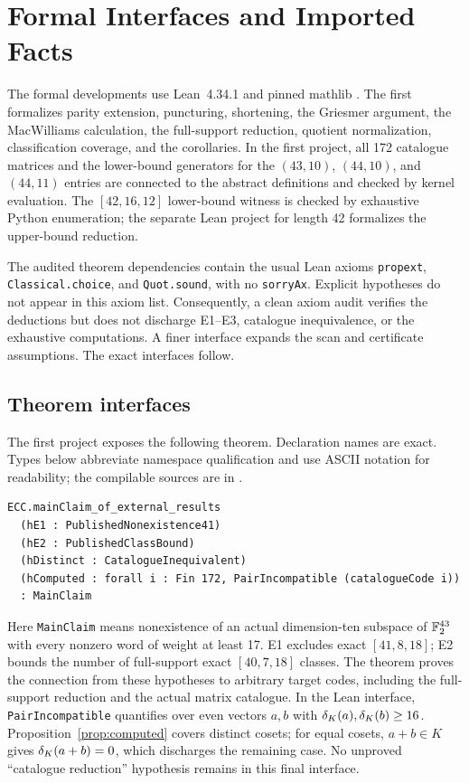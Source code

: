 \section{Formal Interfaces and Imported Facts}
\label{app:formal}
The formal developments use Lean~4.34.1 \citep{lean2021} and pinned mathlib \citep{mathlib2020}. The first formalizes parity extension, puncturing, shortening, the Griesmer argument, the MacWilliams calculation, the full-support reduction, quotient normalization, classification coverage, and the corollaries. In the first project, all 172 catalogue matrices and the lower-bound generators for the $(43,10)$, $(44,10)$, and $(44,11)$ entries are connected to the abstract definitions and checked by kernel evaluation. The $[42,16,12]$ lower-bound witness is checked by exhaustive Python enumeration; the separate Lean project for length 42 formalizes the upper-bound reduction.

The audited theorem dependencies contain the usual Lean axioms \texttt{propext}, \texttt{Classical.choice}, and \texttt{Quot.sound}, with no \texttt{sorryAx}. Explicit hypotheses do not appear in this axiom list. Consequently, a clean axiom audit verifies the deductions but does not discharge E1--E3, catalogue inequivalence, or the exhaustive computations. A finer interface expands the scan and certificate assumptions. The exact interfaces follow.

\subsection{Theorem interfaces}
The first project exposes the following theorem. Declaration names are exact. Types below abbreviate namespace qualification and use ASCII notation for readability; the compilable sources are in .
\begin{lstlisting}[basicstyle=\ttfamily\small,breaklines=true]
ECC.mainClaim_of_external_results
  (hE1 : PublishedNonexistence41)
  (hE2 : PublishedClassBound)
  (hDistinct : CatalogueInequivalent)
  (hComputed : forall i : Fin 172, PairIncompatible (catalogueCode i))
  : MainClaim
\end{lstlisting}
Here \texttt{MainClaim} means nonexistence of an actual dimension-ten subspace of $\mathbb F_2^{43}$ with every nonzero word of weight at least 17. E1 excludes exact $[41,8,18]$; E2 bounds the number of full-support exact $[40,7,18]$ classes. The theorem proves the connection from these hypotheses to arbitrary target codes, including the full-support reduction and the actual matrix catalogue. In the Lean interface, \texttt{PairIncompatible} quantifies over even vectors $a,b$ with $\delta_K(a),\delta_K(b)\ge16$. Proposition~\ref{prop:computed} covers distinct cosets; for equal cosets, $a+b\in K$ gives $\delta_K(a+b)=0$, which discharges the remaining case. No unproved ``catalogue reduction'' hypothesis remains in this final interface.


